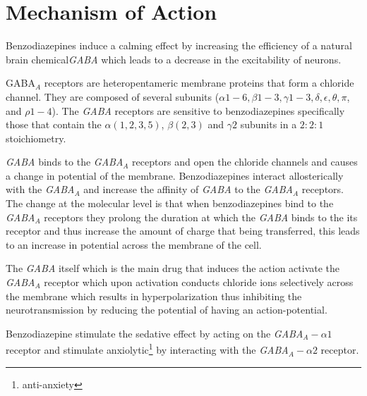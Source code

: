 \chapter{Mechanism of Action}
Benzodiazepines induce a calming effect by increasing the efficiency of a natural brain chemical\emph{GABA} which leads to a decrease in the excitability of neurons.

GABA$_A$ receptors are heteropentameric membrane proteins that form a chloride channel. They are composed of several subunits ($\alpha 1-6, \beta 1-3, \gamma 1-3, \delta, \epsilon, \theta, \pi$, and $\rho 1-4$). The \emph{GABA} receptors are sensitive to benzodiazepines specifically those that contain the $\alpha(1,2,3,5)$, $\beta(2,3)$ and $\gamma 2$ subunits in a $2:2:1$ stoichiometry.

\emph{GABA} binds to the \emph{GABA$_A$} receptors and open the chloride channels and causes a change in potential of the membrane. Benzodiazepines interact allosterically with the \emph{GABA$_A$} and increase the affinity of \emph{GABA} to the \emph{GABA$_A$} receptors. The change at the molecular level is that when benzodiazepines bind to the \emph{GABA$_A$} receptors they prolong the duration at which the \emph{GABA} binds to the its receptor and thus increase the amount of charge that being transferred, this leads to an increase in potential across the membrane of the cell.


The \emph{GABA} itself which is the main drug that induces the action activate the \emph{GABA$_A$} receptor which upon activation conducts chloride ions selectively across the membrane which results in hyperpolarization thus inhibiting the neurotransmission by reducing the potential of having an action-potential. 

Benzodiazepine stimulate the sedative effect by acting on the \emph{GABA$_A-\alpha 1$} receptor\cite{rudolph1999benzodiazepine} and stimulate anxiolytic\footnote{anti-anxiety} by interacting with the \emph{GABA$_A-\alpha 2$} receptor.\cite{kopp2004modulation} 




